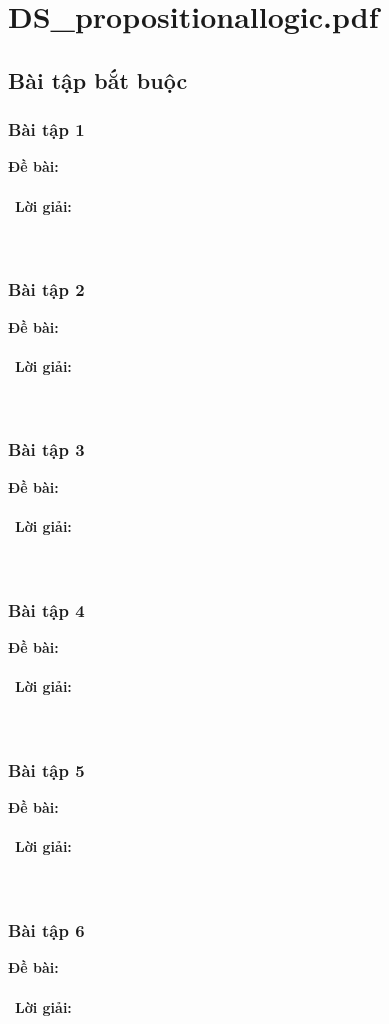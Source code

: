 \documentclass[a4paper]{article}
\begin{document}
\tableofcontents
\newpage
\section{DS\_propositionallogic.pdf}
\subsection{Bài tập bắt buộc}
\subsubsection{Bài tập 1}
\textbf{Đề bài:} 
\\\ \\\
\textbf{Lời giải:} \\\ \\\
\clearpage
\subsubsection{Bài tập 2}
\textbf{Đề bài:} 
\\\ \\\
\textbf{Lời giải:} \\\ \\\
\clearpage
\subsubsection{Bài tập 3}
\textbf{Đề bài:} 
\\\ \\\
\textbf{Lời giải:} \\\ \\\
\clearpage
\subsubsection{Bài tập 4}
\textbf{Đề bài:} 
\\\ \\\
\textbf{Lời giải:} \\\ \\\
\clearpage
\subsubsection{Bài tập 5}
\textbf{Đề bài:} 
\\\ \\\
\textbf{Lời giải:} \\\ \\\
\clearpage
\subsubsection{Bài tập 6}
\textbf{Đề bài:} 
\\\ \\\
\textbf{Lời giải:} \\\ \\\
\clearpage
\end{document}
